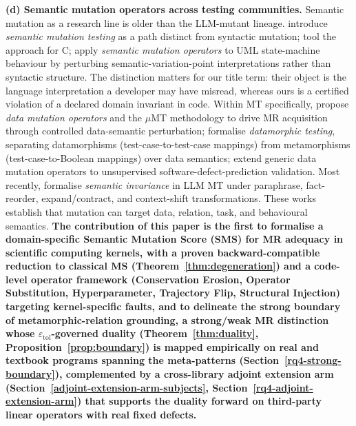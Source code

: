 \documentclass[manuscript,screen,review]{acmart}
\begin{document}
\textbf{(d) Semantic mutation operators across testing communities.}
Semantic mutation as a research line is older than the LLM-mutant
lineage. \citet{clark2010semanticmut} introduce \emph{semantic
mutation testing} as a path distinct from syntactic mutation; \citet{dan2012smtc}
tool the approach for C; \citet{derezinska2019uml}
apply \emph{semantic mutation operators} to UML state-machine behaviour
by perturbing semantic-variation-point interpretations rather than
syntactic structure. The distinction matters for our title term: their
object is the language interpretation a developer may have misread,
whereas ours is a certified violation of a declared domain invariant in
code. Within MT specifically, \citet{sun2016mumt,sun2024datamutation}
propose \emph{data mutation operators} and the $\mu$MT methodology to drive
MR acquisition through controlled data-semantic perturbation; \citet{zhu2020datamorphic}
formalise \emph{datamorphic testing}, separating
datamorphisms (test-case-to-test-case mappings) from metamorphisms
(test-case-to-Boolean mappings) over data semantics; \citet{chan2024metamorphic}
extend generic data mutation operators to unsupervised
software-defect-prediction validation. Most recently, \citet{curto2025semanticinvariance}
formalise \emph{semantic invariance} in LLM MT under paraphrase,
fact-reorder, expand/contract, and context-shift transformations. These
works establish that mutation can target data, relation, task, and
behavioural semantics. \textbf{The contribution of this paper is the
first to formalise a domain-specific Semantic Mutation Score (SMS) for
MR adequacy in scientific computing kernels, with a proven
backward-compatible reduction to classical MS (Theorem~\ref{thm:degeneration}) and a
code-level operator framework (Conservation Erosion, Operator
Substitution, Hyperparameter, Trajectory Flip, Structural Injection)
targeting kernel-specific faults, and to delineate the strong boundary
of metamorphic-relation grounding, a strong/weak MR distinction whose
$\varepsilon_{\mathrm{tol}}$-governed duality (Theorem~\ref{thm:duality}, Proposition~\ref{prop:boundary})
is mapped empirically on real and textbook programs spanning the
meta-patterns (Section~\ref{rq4-strong-boundary}), complemented by a cross-library adjoint extension
arm (Section~\ref{adjoint-extension-arm-subjects}, Section~\ref{rq4-adjoint-extension-arm}) that supports the duality forward on third-party
linear operators with real fixed defects.}
\end{document}
